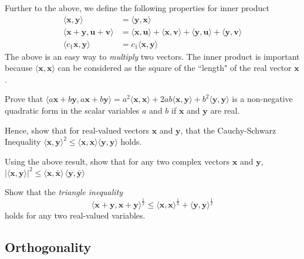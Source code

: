Further to the above, we define the following properties for inner product
%
\begin{subequations}
	\begin{align}
	\langle \bm{x}, \bm{y} \rangle &= 	\langle \bm{y}, \bm{x} \rangle \\
	\langle \bm{x} + \bm{y},  \bm{u} + \bm{v}\rangle &= \langle \bm{x}, \bm{u} \rangle  + \langle \bm{x}, \bm{v} \rangle + \langle \bm{y}, \bm{u} \rangle + \langle \bm{y}, \bm{v} \rangle \\
	\langle c_1 \bm{x}, \bm{y} \rangle &= c_1 \langle \bm{x}, \bm{y} \rangle
	\end{align}
\end{subequations}
%
The above is an easy way to \textit{multiply} two vectors. The inner product is important because $\langle \bm{x}, \bm{x} \rangle$ can be considered as the square of the ``length" of the real vector $\bm{x}$. 
%
\begin{homework}
	Prove that $\langle a\bm{x}+b \bm{y}, a\bm{x}+b \bm{y} \rangle = a^2 \langle \bm{x}, \bm{x} \rangle + 2 ab \langle \bm{x}, \bm{y} \rangle  + b^2 \langle \bm{y}, \bm{y} \rangle $ is a non-negative quadratic form in the scalar variables $a$ and $b$ if $\bm{x}$ and $\bm{y}$ are real.
\end{homework}
%
\begin{homework}
	Hence, show that for real-valued vectors $\bm{x}$ and $\bm{y}$, that the Cauchy-Schwarz Inequality $\langle \bm{x}, \bm{y} \rangle^2 \le  \langle \bm{x}, \bm{x} \rangle \langle \bm{y}, \bm{y} \rangle$ holds.
\end{homework}
%
\begin{homework}
	Using the above result, show that  for any two complex vectors $\bm{x}$  and $\bm{y}$, $|\langle \bm{x}, \bm{y}\rangle|^2 \le \langle \bm{x}, \bar{\bm{x}}\rangle \, \langle \bm{y}, \bar{\bm{y}}\rangle$
\end{homework}
%
\begin{homework}
	Show that the \textit{triangle inequality} 
	\[
		\langle \bm{x}+ \bm{y}, \bm{x}+ \bm{y} \rangle^{\frac{1}{2}} \le \langle \bm{x}, \bm{x} \rangle^{\frac{1}{2}}  + \langle  \bm{y},  \bm{y} \rangle^{\frac{1}{2}} 
	\]
	holds for any two real-valued variables.
\end{homework}

\subsection{Orthogonality}

